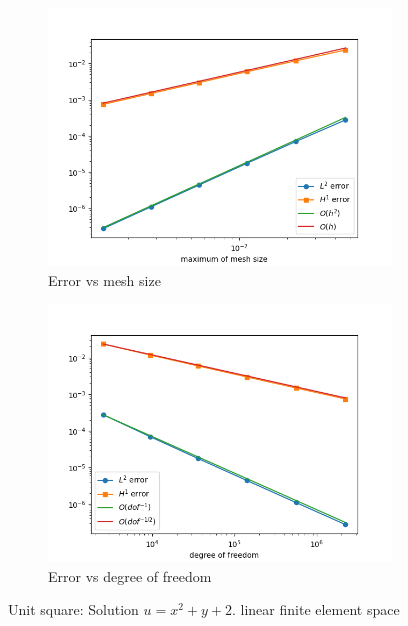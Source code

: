 \documentclass[12pt]{article}%
\theoremstyle{plain}
\numberwithin{equation}{section}
\begin{document}
 \begin{figure}[H]%
    \centering
         \begin{subfigure}[h]{0.45\linewidth}
          \caption{Error vs mesh size}
\includegraphics[width=\linewidth]{figures/Ex3/Ex3_test_2.png}
\end{subfigure}
  \begin{subfigure}[h]{0.45\linewidth}
   \caption{Error vs degree of freedom}
\includegraphics[width=\linewidth]{figures/Ex3/Ex3_test_2_dof.png}
\end{subfigure}
  \caption{Unit square: Solution $u=x^2+y+2$. linear finite element space }
  \label{fig:Ex3_test_2}
 \end{figure}
 
\end{document}
